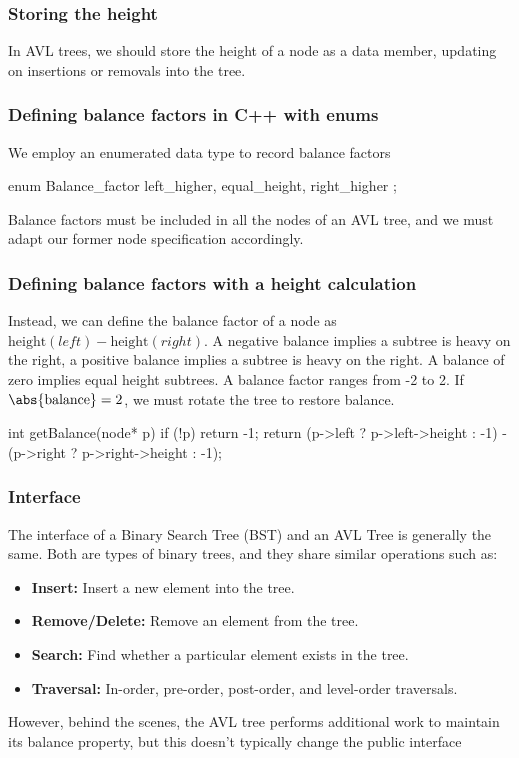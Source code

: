\documentclass{report}
\begin{document}
\bigbreak \noindent 
\subsubsection{Storing the height}
\bigbreak \noindent 
In AVL trees, we should store the height of a node as a data member, updating on insertions or removals into the tree. 

\pagebreak 
\subsubsection{Defining balance factors in C++ with enums}
\bigbreak \noindent 
We employ an enumerated data type to record balance factors
\bigbreak \noindent 
\begin{cppcode}
    enum Balance_factor { left_higher, equal_height, right_higher };
\end{cppcode}
\bigbreak \noindent 
Balance factors must be included in all the nodes of an AVL tree, and we must adapt our former node specification accordingly.

\bigbreak \noindent 
\subsubsection{Defining balance factors with a height calculation}
\bigbreak \noindent 
Instead, we can define the balance factor of a node as $\text{height}(left) - \text{height}(right)$. A negative balance implies a subtree is heavy on the right, a positive balance implies a subtree is heavy on the right. A balance of zero implies equal height subtrees. A balance factor ranges from -2 to 2. If $\abs{\text{balance}} = 2$, we must rotate the tree to restore balance.
\bigbreak \noindent 
\begin{cppcode}
    int getBalance(node* p) {
        if (!p) return -1;
        return (p->left ? p->left->height : -1) - (p->right ? p->right->height : -1);
    }
\end{cppcode}


\pagebreak 
\subsubsection{Interface}
\bigbreak \noindent 
The interface of a Binary Search Tree (BST) and an AVL Tree is generally the same. Both are types of binary trees, and they share similar operations such as:
\begin{itemize}
    \item \textbf{Insert:} Insert a new element into the tree.
    \item \textbf{Remove/Delete:} Remove an element from the tree.
    \item \textbf{Search:} Find whether a particular element exists in the tree.
    \item \textbf{Traversal:} In-order, pre-order, post-order, and level-order traversals.
\end{itemize}
However, behind the scenes, the AVL tree performs additional work to maintain its balance property, but this doesn't typically change the public interface
\end{document}
